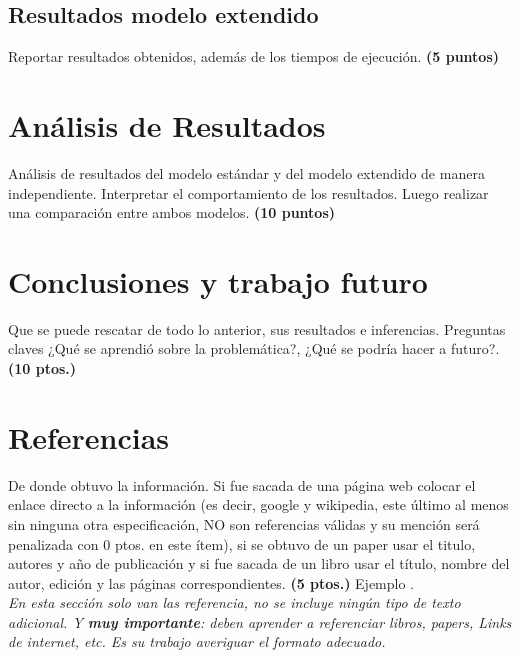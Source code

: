 \documentclass[journal, 10pt]{IEEEtran}
\begin{document}
\subsection{Resultados modelo extendido}
Reportar resultados obtenidos, además de los tiempos de ejecución. \textbf{(5 puntos)}

\section{Análisis de Resultados}
Análisis de resultados del modelo estándar y del modelo extendido de manera independiente. Interpretar el comportamiento de los resultados. Luego realizar una comparación entre ambos modelos. \textbf{(10 puntos)}

\section{Conclusiones y trabajo futuro}

Que se puede rescatar de todo lo anterior, sus resultados e inferencias. Preguntas claves ¿Qué se aprendió sobre la problemática?, ¿Qué se podría hacer a futuro?. \textbf{(10 ptos.)}

\section{Referencias}

De donde obtuvo la información. Si fue sacada de una página web colocar el enlace directo a la información (es decir, google y wikipedia, este último al menos sin ninguna otra especificación, NO son referencias válidas y su mención será penalizada con 0 ptos. en este ítem), si se obtuvo de un paper usar el titulo, autores y año de publicación y si fue sacada de un libro usar el título, nombre del autor, edición y las páginas correspondientes. \textbf{(5 ptos.)} Ejemplo \cite{Winston:1994} \cite{HillierLiebermann:1991}.\\

\textit{En esta sección solo van las referencia, no se incluye ningún tipo de texto adicional. Y \textbf{muy importante}: deben aprender a referenciar libros, papers, Links de internet, etc. Es su trabajo averiguar el formato adecuado.}



\end{document}
